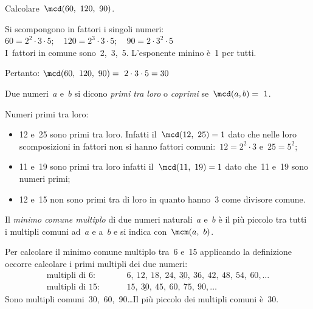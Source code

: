 \begin{esempio}{}{}
Calcolare~\(\mcd(60,~120,~90)\).

Si scompongono in fattori i singoli numeri:\\
\(60 = 2^2\cdot3\cdot5; 
\quad 120 = 2^3\cdot3\cdot5; 
\quad 90 = 2\cdot3^2\cdot5\)\\
I~fattori in comune sono~2,~3,~5. L'esponente minino è~1 per tutti.

Pertanto: \quad \(\mcd(60,~120,~90)=~2\cdot3\cdot5=30\)
\end{esempio}

\begin{definizione}{}{}
Due numeri~\(a\) e~\(b\) si dicono \emph{primi tra loro} o \emph{coprimi} 
se~\(\mcd(a,b) =~1\).
\end{definizione}

\begin{esempio}{}{}
Numeri primi tra loro:
\begin{itemize} [noitemsep]
\item 12 e~25 sono primi tra loro. Infatti il~\(\mcd(12,~25)=1\) dato che 
nelle loro scomposizioni in fattori non si hanno fattori 
comuni:~\(12 =2^2\cdot3\) e~\(25=5^2\);
\item 11 e~19 sono primi tra loro infatti il~\(\mcd(11,~19)=1\) dato che~11 
e~19 sono numeri primi;
\item 12 e~15 non sono primi tra di loro in quanto hanno~3 come divisore 
comune.
\end{itemize}
\end{esempio}

\begin{definizione}{}{}
Il \emph{minimo comune multiplo} di due numeri naturali~\(a\) e~\(b\) è il più
piccolo tra tutti i multipli comuni ad~\(a\) e a~\(b\) 
e si indica con~\(\mcm(a,~b)\).
\end{definizione}

Per calcolare il minimo comune multiplo tra~6 e~15 applicando la 
definizione 
occorre calcolare i primi multipli dei due numeri:
\begin{align*}
\text{multipli di }6: & 
\qquad~6,~12,~18,~24,~\underline{30},~36,~42,~48,~54,~60,\ldots \\
\text{multipli di }15: & \qquad~15,~\underline{30},~45,~60,~75,~90,\ldots
\end{align*}
Sono multipli comuni~30,~60,~90\ldots Il più piccolo dei multipli comuni 
è~30.

